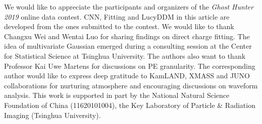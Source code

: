 \acknowledgments
We would like to appreciate the participants and organizers of the \textit{Ghost Hunter 2019} online data contest.  CNN, Fitting and LucyDDM in this article are developed from the ones submitted to the contest.  We would like to thank Changxu Wei and Wentai Luo for sharing findings on direct charge fitting.  The idea of multivariate Gaussian emerged during a consulting session at the Center for Statistical Science at Tsinghua University.  The authors also want to thank Professor Kai Uwe Martens for discussions on PE granularity.  The corresponding author would like to express deep gratitude to KamLAND, XMASS and JUNO collaborations for nurturing atmosphere and encouraging discussions on waveform analysis.  This work is supported in part by the National Natural Science Foundation of China (11620101004), the Key Laboratory of Particle \& Radiation Imaging (Tsinghua University). 

